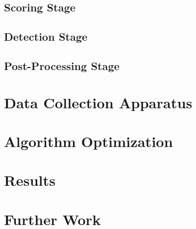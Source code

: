         \section{Scoring Stage}

        \section{Detection Stage}

        \section{Post-Processing Stage}

    \chapter{Data Collection Apparatus}

    \chapter{Algorithm Optimization}

    \chapter{Results}

    \chapter{Further Work}